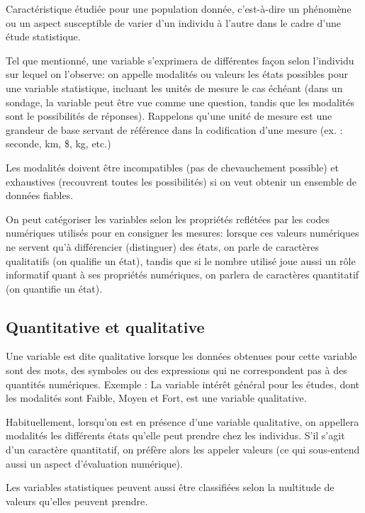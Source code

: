 \documentclass[11pt,fleqn]{book} %
\begin{document}
\begin{definition}
Caractéristique étudiée pour une population donnée, c’est-à-dire un phénomène ou un aspect susceptible de varier d'un individu à l'autre dans le cadre d’une étude statistique.
\end{definition}


Tel que mentionné, une variable s'exprimera de différentes façon selon l'individu sur lequel on l'observe: on appelle modalités ou valeurs les états possibles pour une variable statistique, incluant les unités de mesure le cas échéant (dans un sondage, la variable peut être vue comme une question, tandis que les modalités sont le possibilités de réponses).
Rappelons qu'une unité de mesure est une grandeur de base servant de référence dans la codification d'une mesure (ex. : seconde, km, \$, kg, etc.)

Les modalités doivent être incompatibles (pas de chevauchement possible) 
et exhaustives (recouvrent toutes les possibilités) si on veut obtenir un ensemble de données fiables.

On peut catégoriser les variables selon les propriétés reflétées par les codes numériques utilisés pour en consigner les mesures: lorsque ces valeurs numériques ne servent qu'à différencier (distinguer) des états, on parle de caractères qualitatifs (on qualifie un état), tandis que si le nombre utilisé joue aussi un rôle informatif quant à ses propriétés numériques, on parlera de caractères quantitatif (on quantifie un état).

\subsection{Quantitative et qualitative}

Une variable est dite qualitative lorsque les données obtenues pour cette variable sont des mots, des symboles ou des expressions qui ne correspondent pas à des quantités numériques.
Exemple :  La variable intérêt général pour les études, dont les modalités sont Faible, Moyen et Fort, est une variable qualitative. 


Habituellement, lorsqu'on est en présence d'une variable qualitative, on appellera modalités les différents états qu'elle peut prendre chez les individus. S'il s'agit d'un caractère quantitatif, on préfère alors les appeler valeurs (ce qui sous-entend aussi un aspect d'évaluation numérique).

Les variables statistiques peuvent aussi être classifiées selon la multitude de valeurs qu'elles peuvent prendre.
\end{document}
